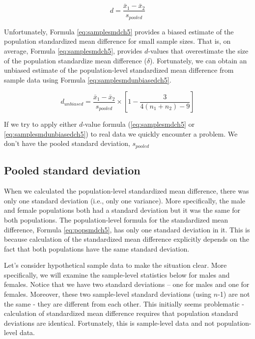 \documentclass[
]{krantz}
\begin{document}
\begin{equation} 
d  = \frac{\bar{x}_{1} - \bar{x}_{2}}{s_{pooled}} 
      \label{eq:samplesmdch5}
\end{equation}

Unfortunately, Formula \eqref{eq:samplesmdch5} provides a biased estimate of the population standardized mean difference for small sample sizes. That is, on average, Formula \eqref{eq:samplesmdch5}, provides \(d\)-values that overestimate the size of the population standardize mean difference (\(\delta\)). Fortunately, we can obtain an unbiased estimate of the population-level standardized mean difference from sample data using Formula \eqref{eq:samplesmdunbiasedch5}.

\begin{equation} 
d_{unbiased}  = \frac{\bar{x}_{1} - \bar{x}_{2}}{s_{pooled}} \times [1 - \frac{3}{4(n_1 + n_2)-9}]
      \label{eq:samplesmdunbiasedch5}
\end{equation}

If we try to apply either \(d\)-value formula (\eqref{eq:samplesmdch5} or \eqref{eq:samplesmdunbiasedch5}) to real data we quickly encounter a problem. We don't have the pooled standard deviation, \(s_{pooled}\)

\hypertarget{pooled-standard-deviation}{%
\subsection{Pooled standard deviation}\label{pooled-standard-deviation}}

When we calculated the population-level standardized mean difference, there was only one standard deviation (i.e., only one variance). More specifically, the male and female populations both had a standard deviation but it was the same for both populations. The population-level formula for the standardized mean difference, Formula \eqref{eq:popsmdch5}, has only one standard deviation in it. This is because calculation of the standardized mean difference explicitly depends on the fact that both populations have the same standard deviation.

Let's consider hypothetical sample data to make the situation clear. More specifically, we will examine the sample-level statistics below for males and females. Notice that we have two standard deviations -- one for males and one for females. Moreover, these two sample-level standard deviations (using \(n\)-1) are not the same - they are different from each other. This initially seems problematic - calculation of standardized mean difference requires that population standard deviations are identical. Fortunately, this is sample-level data and not population-level data.
\end{document}

